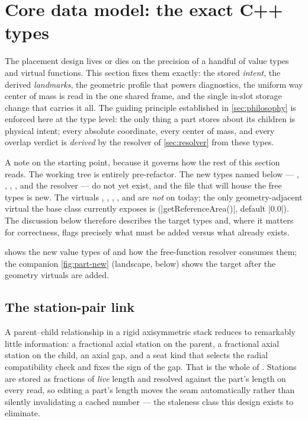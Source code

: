 \section{Core data model: the exact C++ types}\label{sec:datamodel}

The placement design lives or dies on the precision of a handful of value types and virtual
functions. This section fixes them exactly: the stored \emph{intent}, the derived
\emph{landmarks}, the geometric profile that powers diagnostics, the uniform way center of mass is
read in the one shared frame, and the single in-slot storage change that carries it all. The guiding
principle established in \cref{sec:philosophy} is enforced here at the type level: the only thing a
part stores about its children is physical intent; every absolute coordinate, every center of mass,
and every overlap verdict is \emph{derived} by the resolver of \cref{sec:resolver} from these
types.

A note on the starting point, because it governs how the rest of this section reads. The working
tree is entirely pre-refactor. The new types named below --- , ,
, , and the resolver --- do not yet exist, and the file
 that will house the free types is new. The virtuals
, , , , and
 are \emph{not} on  today; the only geometry-adjacent virtual
the base class currently exposes is  (\cppinline|getReferenceArea()|,
default \cppinline|0.0|). The discussion below therefore describes the target types and, where it
matters for correctness, flags precisely what must be added versus what already exists.


 shows the new value types of  and how the
free-function resolver consumes them; the companion \cref{fig:part-new} (landscape, below) shows the
target  after the geometry virtuals are added.

\subsection{The station-pair link}\label{sec:datamodel-link}

A parent--child relationship in a rigid axisymmetric stack reduces to remarkably little
information: a fractional axial station on the parent, a fractional axial station on the child, an
axial gap, and a seat kind that selects the radial compatibility check and fixes the sign of the
gap. That is the whole of . Stations are stored as fractions of \emph{live}
length and resolved against the part's length on every read, so editing a part's length moves the
seam automatically rather than silently invalidating a cached number --- the staleness class this
design exists to eliminate.

